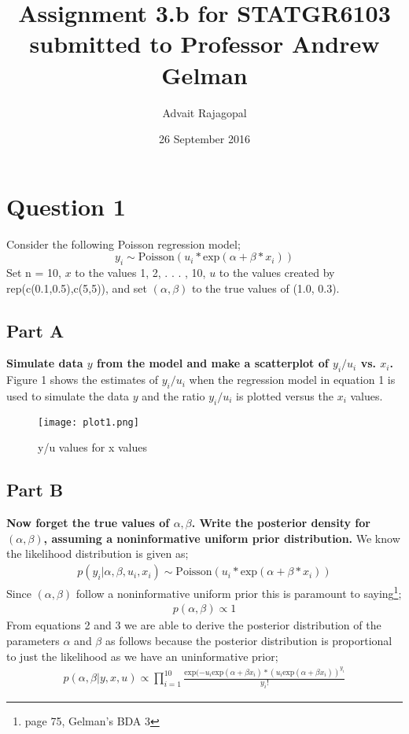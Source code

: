\documentclass{article}
\title{Assignment 3.b for \textbf{STATGR6103}\\
\large submitted to Professor Andrew Gelman}
\date{26 September 2016}
\author{Advait Rajagopal}
\begin{document}
  \maketitle
  
\section{Question 1}
Consider the following Poisson regression model;
\begin{equation}
y_i \sim \text{Poisson} (u_i*\text{exp}(\alpha + \beta*x_i))
\end{equation}
Set n = 10, $x$ to the values 1, 2, . . . , 10, $u$ to the values created by rep(c(0.1,0.5),c(5,5)), and set $(\alpha, \beta)$ to the true values of (1.0, 0.3).

\subsection{Part A}
\textbf{Simulate data $y$ from the model and make a scatterplot of $y_i/u_i$ vs. $x_i$.}\\
Figure 1 shows the estimates of $y_i/u_i$ when the regression model in equation 1 is used to simulate the data $y$ and the ratio $y_i/u_i$ is plotted versus the $x_i$ values.
 \begin{figure}[H]
\centering
\texttt{[image: plot1.png]}
\caption{y/u values for x values}
\label{deltat}
\end{figure}

\subsection{Part B}
\textbf{Now forget the true values of $\alpha, \beta$. Write the posterior density for $(\alpha,\beta)$, assuming a noninformative uniform prior distribution.}
We know the likelihood distribution is given as;
\begin{align}
p(y_i|\alpha, \beta, u_i, x_i) \sim \text{Poisson}(u_i*\text{exp}(\alpha + \beta*x_i))
\end{align}
Since $(\alpha,\beta)$ follow a noninformative uniform prior this is paramount to saying\footnote{page 75, Gelman's BDA 3};
\begin{align}
p(\alpha, \beta) \propto 1
\end{align}
From equations 2 and 3 we are able to derive the posterior distribution of the parameters $\alpha$ and $\beta$ as follows because the posterior distribution is proportional to just the likelihood as we have an uninformative prior;
\begin{align}
p(\alpha, \beta | y, x, u) \propto \prod_{i=1}^{10}\frac{\text{exp}(-u_i\text{exp}(\alpha + \beta x_i) * (u_i\text{exp}(\alpha + \beta x_i))^{y_i}}{y_i !}
\end{align}
\end{document}
